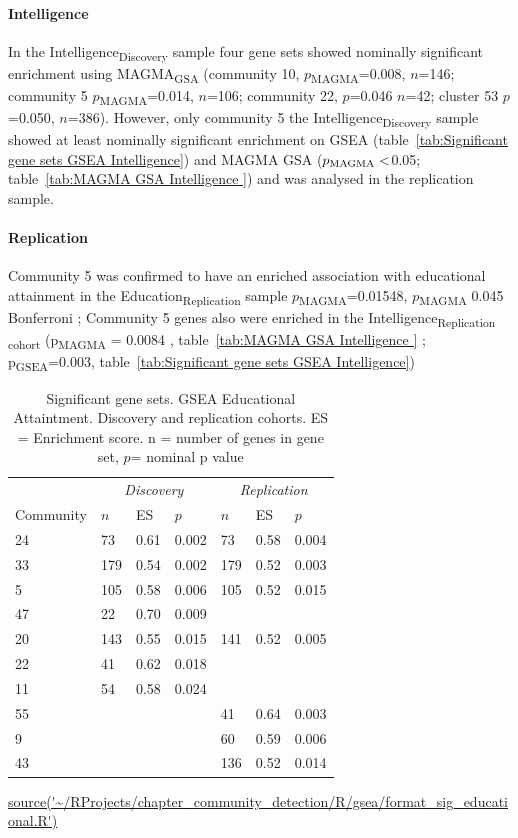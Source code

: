  


\paragraph{Intelligence}In the Intelligence\textsubscript{Discovery} sample four gene sets showed nominally significant enrichment using MAGMA\textsubscript{GSA} (community 10, $p$\textsubscript{MAGMA}=0.008, $n$=146; community 5 $p$\textsubscript{MAGMA}=0.014,  $n$=106; community 22, $p$=0.046 $n$=42; cluster 53 $p$=0.050, $n$=386). However, only community 5  the Intelligence\textsubscript{Discovery} sample showed at least nominally significant enrichment on GSEA (table~\ref{tab:Significant gene sets GSEA Intelligence}) and MAGMA GSA ($p\textsubscript{MAGMA}<$0.05; table~\ref{tab:MAGMA GSA Intelligence }) and was analysed in the replication sample.

\paragraph{Replication}
 Community 5 was confirmed to have an enriched association with educational attainment in the Education\textsubscript{Replication} sample $p$\textsubscript{MAGMA}=0.01548, $p$\textsubscript{MAGMA} 0.045 Bonferroni ; Community 5 genes also were enriched in the Intelligence\textsubscript{Replication cohort} (p\textsubscript{MAGMA} = 0.0084 , table~\ref{tab:MAGMA GSA Intelligence } ; p\textsubscript{GSEA}=0.003,  table~\ref{tab:Significant gene sets GSEA Intelligence})




\begin{table}[ht!]
\centering
\setlength{\extrarowheight}{2pt}
\begin{tabular}{lllllll}
  \toprule
   &  \multicolumn{3}{c}{\textit{Discovery}} & \multicolumn{3}{c}{\textit{Replication}} \\
   \cmidrule{2-7}
Community & $n$ & ES & $p$ & $n$ & ES & $p$ \\ 
  \midrule
24 & 73 & 0.61 & 0.002 & 73 & 0.58 & 0.004 \\ 
  33 & 179 & 0.54 & 0.002 & 179 & 0.52 & 0.003 \\ 
  5 & 105 & 0.58 & 0.006 & 105 & 0.52 & 0.015 \\ 
  47 & 22 & 0.70 & 0.009 &  &  &  \\ 
  20 & 143 & 0.55 & 0.015 & 141 & 0.52 & 0.005 \\ 
  22 & 41 & 0.62 & 0.018 &  &  &  \\ 
  11 & 54 & 0.58 & 0.024 &  &  &  \\ 
  55 &  &  &  & 41 & 0.64 & 0.003 \\ 
  9 &  &  &  & 60 & 0.59 & 0.006 \\ 
  43 &  &  &  & 136 & 0.52 & 0.014 \\ 
   \bottomrule
\end{tabular}
\caption{Significant gene sets. GSEA Educational Attaintment. Discovery and replication cohorts.  ES = Enrichment score. n = number of genes in gene set, $p$= nominal p value} 
\tiny\url{source('~/RProjects/chapter_community_detection/R/gsea/format_sig_educational.R')}
\label{tab:Significant gene sets Educational Attaintment}
\end{table}

